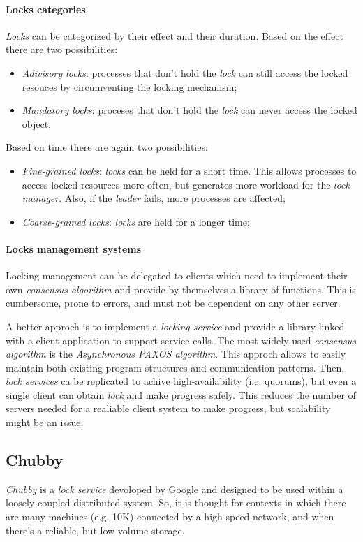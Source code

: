 \paragraph{Locks categories}
\emph{Locks} can be categorized by their effect and their duration. Based on
the effect there are two possibilities:
\begin{itemize}
    \item \emph{Adivisory locks}: processes that don't hold the \emph{lock} can
    still access the locked resouces by circumventing the locking mechanism;
    \item \emph{Mandatory locks}: proceses that don't hold the \emph{lock} can
    never access the locked object;
\end{itemize}
Based on time there are again two possibilities:
\begin{itemize}
    \item \emph{Fine-grained locks}: \emph{locks} can be held for a short time.
    This allows processes to access locked resources more often, but
    generates more workload for the \emph{lock manager}. Also, if the
    \emph{leader} fails, more processes are affected;
    \item \emph{Coarse-grained locks}: \emph{locks} are held for a longer time;
\end{itemize}

\paragraph{Locks management systems}
Locking management can be delegated to clients which need to implement their
own \emph{consensus algorithm} and provide by themselves a library of functions.
This is cumbersome, prone to errors, and must not be dependent on any other server.

A better approch is to implement a \emph{locking service} and provide a library
linked with a client application to support service calls. The most
widely used \emph{consensus algorithm} is the \emph{Asynchronous PAXOS
algorithm}. This approch allows to easily maintain both existing program
structures and communication patterns. Then, \emph{lock services} ca be
replicated to achive high-availability (i.e. quorums), but even a single client
can obtain \emph{lock} and make progress safely. This reduces the number of
servers needed for a realiable client system to make progress, but scalability
might be an issue.

\subsection{Chubby}
\emph{Chubby} is a \emph{lock service} devoloped by Google and designed to be used
within a loosely-coupled distributed system. So, it is thought for contexts in
which there are many machines (e.g. 10K) connected by a high-speed network, and
when there's a reliable, but low volume storage.

